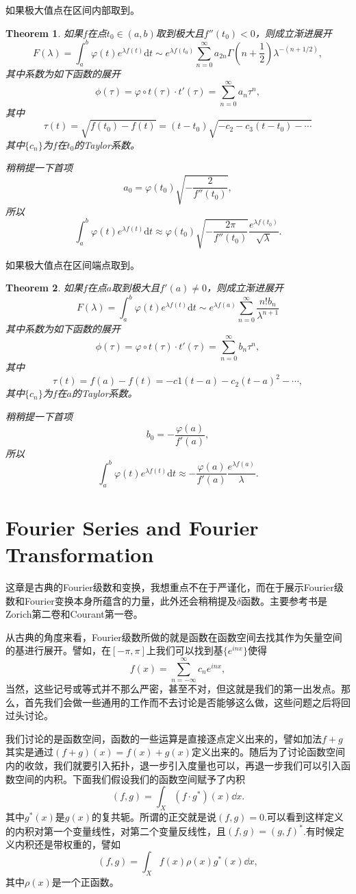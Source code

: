 \documentclass[10pt]{book}
\theoremstyle{plain}%
\newtheorem{theo}{Theorem}[chapter]%
\begin{document}
如果极大值点在区间内部取到。
\begin{theo}
如果$f$在点$t_0\in(a,b)$取到极大且$f''(t_0)<0$，则成立渐进展开
\[
F(\lambda)=\int_a^b \varphi(t) e^{\lambda f(t)} \mathrm{d}t \sim e^{\lambda f(t_0)}\sum_{n=0}^\infty a_{2n}\Gamma\left(n+\frac{1}{2}\right)\lambda^{-(n+1/2)},
\]
其中系数为如下函数的展开
\[
\phi(\tau)=\varphi \circ t(\tau)\cdot t'(\tau)=\sum_{n=0}^\infty a_n\tau^n,
\]
其中
\[
\tau(t)=\sqrt{f(t_0)-f(t)}=(t-t_0)\sqrt{-c_2-c_3(t-t_0)-\cdots}
\]
其中$\{c_n\}$为$f$在$t_0$的Taylor系数。

稍稍提一下首项
\[
a_0=\varphi(t_0)\sqrt{-\frac{2}{f''(t_0)}},
\]
所以
\[
\int_a^b \varphi(t) e^{\lambda f(t)} \mathrm{d}t \approx \varphi(t_0)\sqrt{-\frac{2\pi}{f''(t_0)}}\frac{e^{\lambda f(t_0)}}{\sqrt{\lambda}}.
\]
\end{theo}
如果极大值点在区间端点取到。
\begin{theo}
如果$f$在点$a$取到极大且$f'(a)\neq 0$，则成立渐进展开
\[
F(\lambda)=\int_a^b \varphi(t) e^{\lambda f(t)} \mathrm{d}t \sim e^{\lambda f(a)}\sum_{n=0}^\infty \frac{n!b_n}{\lambda^{n+1}}
\]
其中系数为如下函数的展开
\[
\phi(\tau)=\varphi \circ t(\tau)\cdot t'(\tau)=\sum_{n=0}^\infty b_n\tau^n,
\]
其中
\[
\tau(t) =f(a)-f(t)=-c1(t-a)-c_2(t-a)^2-\cdots,
\]
其中$\{c_n\}$为$f$在$a$的Taylor系数。

稍稍提一下首项
\[
b_0=-\frac{\varphi(a)}{f'(a)},
\]
所以
\[
\int_a^b \varphi(t) e^{\lambda f(t)} \mathrm{d}t \approx -\frac{\varphi(a)}{f'(a)}\frac{e^{\lambda f(a)}}{\lambda}.
\]
\end{theo}
\chapter{Fourier Series and Fourier Transformation}
这章是古典的Fourier级数和变换，我想重点不在于严谨化，而在于展示Fourier级数和Fourier变换本身所蕴含的力量，此外还会稍稍提及$\delta$函数。主要参考书是Zorich第二卷和Courant第一卷。

从古典的角度来看，Fourier级数所做的就是函数在函数空间去找其作为矢量空间的基进行展开。譬如，在$[-\pi,\pi]$上我们可以找到基$\{e^{inx}\}$使得
\[
	f(x)=\sum_{n=-\infty}^\infty c_ne^{inx},
\]
当然，这些记号或等式并不那么严密，甚至不对，但这就是我们的第一出发点。那么，首先我们会做一些通用的工作而不去讨论是否能够这么做，这些问题之后将回过头讨论。

我们讨论的是函数空间，函数的一些运算是直接逐点定义出来的，譬如加法$f+g$其实是通过$(f+g)(x)=f(x)+g(x)$定义出来的。随后为了讨论函数空间内的收敛，我们就要引入拓扑，退一步引入度量也可以，再退一步我们可以引入函数空间的内积。下面我们假设我们的函数空间赋予了内积
\[
	(f,g)=\int_X (f\cdot g^*)(x)\dd x.
\]
其中$g^*(x)$是$g(x)$的复共轭。所谓的正交就是说$(f,g)=0$.可以看到这样定义的内积对第一个变量线性，对第二个变量反线性，且$(f,g)=(g,f)^*$.有时候定义内积还是带权重的，譬如
\[
	(f,g)=\int_X f(x)\rho(x)g^*(x)\dd x,
\]
其中$\rho(x)$是一个正函数。
\end{document}
